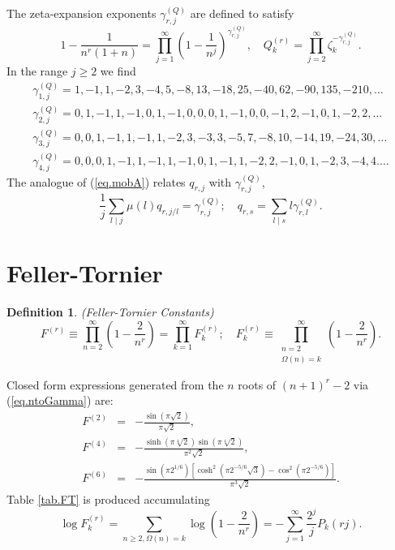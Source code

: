 \documentclass{amsart}
\newtheorem{defn}{Definition}
\begin{document}
The zeta-expansion exponents $\gamma_{r,j}^{(Q)}$ are defined to satisfy
\begin{equation}
1-\frac{1}{n^r(1+n)} = \prod_{j=1}^\infty \left(1-\frac{1}{n^j}\right)^{\gamma_{r,j}^{(Q)}}
,\quad
Q_k^{(r)}=\prod_{j=2}^\infty \zeta_k^{-\gamma_{r,j}^{(Q)}}
.
\end{equation}
In the range $j\ge 2$ we find
\begin{eqnarray}
\gamma_{1,j}^{(Q)} =  1, -1, 1, -2, 3, -4, 5, -8, 13, -18, 25, -40, 62, -90, 135, -210,
\ldots
\\
\gamma_{2,j}^{(Q)} = 0, 1, -1, 1, -1, 0, 1, -1, 0, 0, 0, 1, -1, 0, 0, -1, 2, -1, 0, 1, -2, 2,
\ldots
\\
\gamma_{3,j}^{(Q)} = 0, 0, 1, -1, 1, -1, 1, -2, 3, -3, 3, -5, 7, -8, 10, -14, 19, -24, 30,
\ldots
\\
\gamma_{4,j}^{(Q)} = 0, 0, 0, 1, -1, 1, -1, 1, -1, 0, 1, -1, 1, -2, 2, -1, 0, 1, -2, 3, -4, 4.
\ldots
\end{eqnarray}
The analogue of (\ref{eq.mobA})
relates $q_{r,j}$ with $\gamma_{r,j}^{(Q)}$,
\begin{equation}
\frac{1}{j}\sum_{l\mid j}\mu(l) q_{r,j/l} = \gamma_{r,j}^{(Q)};\quad
q_{r,s} = \sum_{l\mid s}l \gamma_{r,l}^{(Q)}.
\end{equation}

\section{Feller-Tornier}
\begin{defn}
(Feller-Tornier Constants)
\begin{equation}
F^{(r)}\equiv \prod_{n=2}^\infty \left(1-\frac{2}{n^r} \right)
=\prod_{k=1}^\infty F_k^{(r)};\quad 
F_k^{(r)}\equiv \prod_{\substack{n=2\\ \Omega(n)=k}}^\infty 
\left(1-\frac{2}{n^r} \right)
.
\label{eq.FTdef}
\end{equation}
\end{defn}
Closed form expressions generated from the $n$ roots of $(n+1)^r-2$ via
(\ref{eq.ntoGamma}) are:
\begin{eqnarray}
F^{(2)} &=& - \frac{\sin(\pi\surd 2)}{\pi \surd 2},
\\
F^{(4)} &=& - \frac{\sinh(\pi \sqrt[4]{2})\sin(\pi\sqrt[4]{2})}{\pi^2 \surd 2}
,
\\
F^{(6)} &=& - \frac{\sin(\pi 2^{1/6})
\left[\cosh^2(\pi 2^{-5/6}\surd 3)-\cos^2(\pi 2^{-5/6})\right]
}{\pi^3\surd 2}
.
\end{eqnarray}
Table \ref{tab.FT} is produced accumulating
\begin{equation}
\log F_k^{(r)} =
\sum_{n\ge 2,\Omega(n)=k} \log\left(1-\frac{2}{n^r}\right)
=
-\sum_{j=1}^\infty \frac{2^j}{j}P_k(rj)
.
\label{eq.logFkr}
\end{equation}
\end{document}

